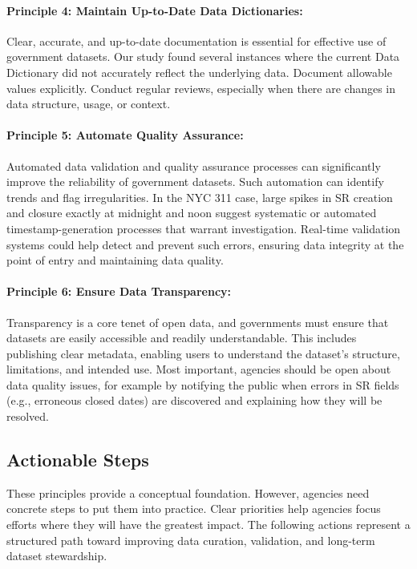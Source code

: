 \documentclass[linenumber]{jdsart}
\begin{document}
\paragraph{Principle 4: Maintain Up-to-Date Data Dictionaries:}
Clear, accurate, and \mbox{up-to-date} documentation is essential for 
effective use of government datasets. Our study found several 
instances where the current Data Dictionary did not accurately 
reflect the underlying data. Document allowable values 
explicitly. Conduct regular reviews, especially when there are 
changes in data structure, usage, or context.

\paragraph{Principle 5: Automate Quality Assurance:}
Automated data validation and quality assurance processes can 
significantly improve the reliability of government datasets. Such 
automation can identify trends and flag irregularities. In 
the NYC 311 case, large spikes in SR creation and closure 
exactly at midnight and noon suggest systematic or 
automated \mbox{timestamp-generation} processes 
that warrant investigation. \mbox{Real-time} validation systems 
could help detect and prevent such errors, ensuring data 
integrity at the point of entry and maintaining data quality.

\paragraph{Principle 6: Ensure Data Transparency:}
Transparency is a core tenet of open data, and governments must ensure 
that datasets are easily accessible and readily understandable. This 
includes publishing clear metadata, enabling users to understand the 
dataset’s structure, limitations, and intended use. Most important, 
agencies should be open about data quality issues, for example 
by notifying the public when errors in SR fields (e.g., erroneous 
closed dates) are discovered and explaining how they will be resolved.

\subsection{Actionable Steps}
\label{subsec:actions}

These principles provide a conceptual foundation. However, 
agencies need concrete steps to put them into practice. Clear 
priorities help agencies focus efforts where they will have the 
greatest impact. The following actions represent a structured path toward 
improving data curation, validation, and long-term dataset stewardship.
\end{document}
